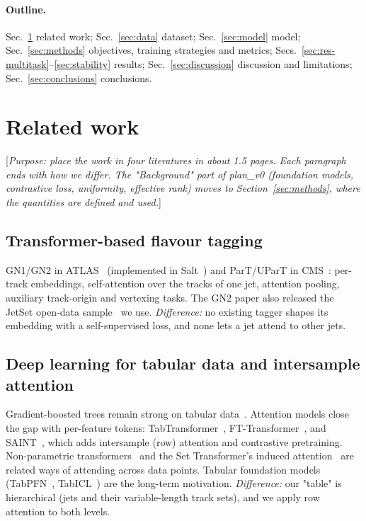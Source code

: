 \documentclass[11pt,a4paper]{article}
\newcommand{\note}[1]{\textcolor{blue!70!black}{[\emph{#1}]}}
\begin{document}
\paragraph{Outline.} Sec.~\ref{sec:related} related work; Sec.~\ref{sec:data} dataset;
Sec.~\ref{sec:model} model; Sec.~\ref{sec:methods} objectives, training strategies and
metrics; Secs.~\ref{sec:res-multitask}--\ref{sec:stability} results;
Sec.~\ref{sec:discussion} discussion and limitations; Sec.~\ref{sec:conclusions} conclusions.

\section{Related work}
\label{sec:related}

\note{Purpose: place the work in four literatures in about 1.5 pages. Each paragraph ends
with how we differ. The "Background" part of plan\_v0 (foundation models, contrastive
loss, uniformity, effective rank) moves to Section~\ref{sec:methods}, where the
quantities are defined and used.}

\subsection{Transformer-based flavour tagging}
GN1/GN2 in ATLAS~\citep{GN1,GN2} (implemented in Salt~\citep{Barr2025Salt}) and ParT/UParT
in CMS~\citep{Qu:2022,CMSDP2025081}: per-track embeddings, self-attention over the tracks
of one jet, attention pooling, auxiliary track-origin and vertexing tasks. The GN2 paper
also released the JetSet open-data sample~\citep{ATLASJetSet2025} we use. \emph{Difference:}
no existing tagger shapes its embedding with a self-supervised loss, and none lets a jet
attend to other jets.

\subsection{Deep learning for tabular data and intersample attention}
Gradient-boosted trees remain strong on tabular data~\citep{Grinsztajn2022TreesTabular}.
Attention models close the gap with per-feature tokens: TabTransformer~\citep{Huang2020TabTransformer},
FT-Transformer~\citep{Gorishniy2021FTTransformer}, and SAINT~\citep{somepalli2021saint},
which adds intersample (row) attention and contrastive pretraining. Non-parametric
transformers~\citep{Kossen2021NPT} and the Set Transformer's induced attention~\citep{lee2019settransformerframeworkattentionbased}
are related ways of attending across data points. Tabular foundation models (TabPFN~\citep{Hollmann2025TabPFNNature},
TabICL~\citep{Qu2025TabICL}) are the long-term motivation. \emph{Difference:} our
"table" is hierarchical (jets and their variable-length track sets), and we apply row
attention to both levels.
\end{document}
